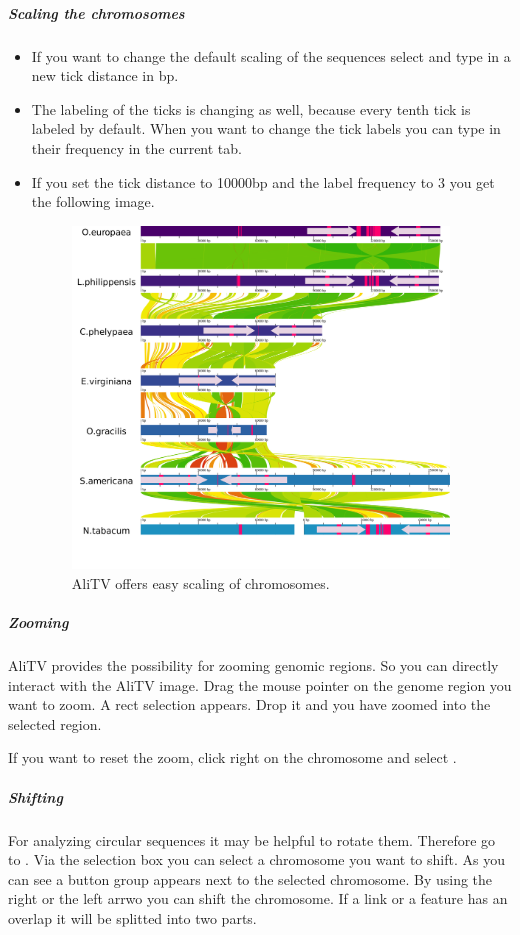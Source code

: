 \documentclass[a4paper]{scrartcl}
\begin{document}
\subparagraph*{Scaling the chromosomes}
\begin{itemize}
	\item If you want to change the default scaling of the sequences select  and type in a new tick distance in bp. 
	\item The labeling of the ticks is changing as well, because every tenth tick is labeled by default. When you want to change the tick labels you can type in their frequency in the current tab.
	\item If you set the tick distance to 10000bp and the label frequency to 3 you get the following image.
	\begin{figure}
		\centering
		\includegraphics[width=10cm]{newLabels.png}
		\caption{AliTV offers easy scaling of chromosomes.}
	\end{figure}
\end{itemize}

\subparagraph*{Zooming}
AliTV provides the possibility for zooming genomic regions. So you can directly interact with the AliTV image.
Drag the mouse pointer on the genome region you want to zoom. A rect selection appears. Drop it and you have zoomed into the selected region.

If you want to reset the zoom, click right on the chromosome and select .

\subparagraph*{Shifting}
For analyzing circular sequences it may be helpful to rotate them. Therefore go to . Via the selection box you can select a chromosome you want to shift. As you can see a button group appears next to the selected chromosome. By using the right or the left arrwo you can shift the chromosome. If a link or a feature has an overlap it will be splitted into two parts. 
\end{document}
